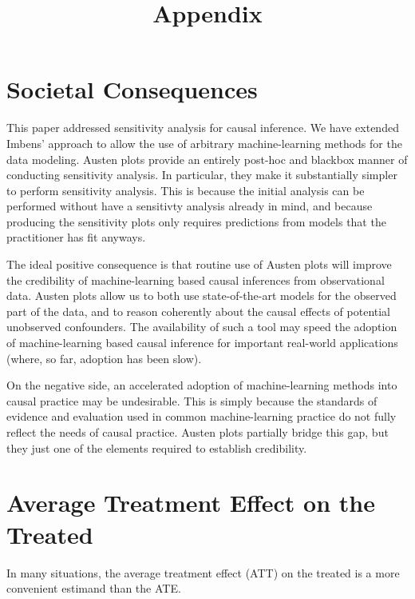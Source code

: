 \documentclass{article}
\begin{document}
%

\newpage
\section{Societal Consequences}
This paper addressed sensitivity analysis for causal inference.
We have extended Imbens' approach to allow the use of arbitrary machine-learning methods
for the data modeling.
Austen plots provide an entirely post-hoc and blackbox manner of conducting sensitivity analysis.
In particular, they make it substantially simpler to perform sensitivity analysis.
This is because the initial analysis can be performed without have a sensitivty analysis already in mind,
and because producing the sensitivity plots only requires predictions from models that the practitioner has fit anyways.

The ideal positive consequence is that routine use of Austen plots will improve the credibility of machine-learning based
causal inferences from observational data.
Austen plots allow us to both use state-of-the-art models for the observed part of the data, and to reason coherently about the
causal effects of potential unobserved confounders. 
The availability of such a tool may speed the adoption of machine-learning based causal inference
for important real-world applications (where, so far, adoption has been slow).

On the negative side, an accelerated adoption of machine-learning methods into causal practice
may be undesirable. This is simply because the standards of evidence and evaluation used in common
machine-learning practice do not fully reflect the needs of causal practice.
Austen plots partially bridge this gap, but they just one of the elements required to establish credibility. 

\printbibliography

\newpage
\appendix
\onecolumn

\title{Appendix}
\date{\vspace{-5ex}}
\maketitle

\section{Average Treatment Effect on the Treated}
\label{sec:att}
In many situations, the average treatment effect (ATT) on the treated is a more convenient estimand than the ATE.
\end{document}
